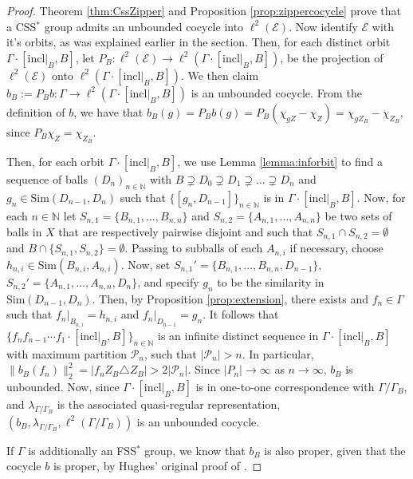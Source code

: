 \documentclass[12pt]{amsart}
\numberwithin{equation}{subsection}
\theoremstyle{definition}
\theoremstyle{definition}
\theoremstyle{remark}
\begin{document}
\begin{proof}
     Theorem \ref{thm:CssZipper} and Proposition \ref{prop:zippercocycle} prove that a CSS$^*$ group admits an unbounded cocycle into $\ell^2(\mathcal E)$. Now identify $\mathcal E$ with it's orbits, as was explained earlier in the section. Then, for each distinct orbit $\Gamma \cdot [\text{incl}\vert_B, B]$, let $P_B: \ell^2(\mathcal E) \rightarrow \ell^2(\Gamma \cdot [\text{incl}\vert_B, B])$, be the projection of $\ell^2(\mathcal E)$ onto $\ell^2(\Gamma \cdot [\text{incl}\vert_B, B])$. We then claim $b_B := P_Bb: \Gamma \rightarrow \ell^2(\Gamma \cdot [\text{incl}\vert_B, B])$ is an unbounded cocycle. From the definition of $b$, we have that $b_B(g)= P_Bb(g) = P_B( \chi_{gZ} - \chi_{Z})= \chi_{gZ_B} - \chi_{Z_B}$, since $P_B\chi_Z = \chi_{Z_B}$. 

     Then, for each orbit $\Gamma \cdot [\text{incl}\vert_B, B]$, we use Lemma \ref{lemma:inforbit} to find a sequence of balls $(D_n)_{n \in \mathbb N}$ with $ B \supsetneq D_0 \supsetneq D_1 \supsetneq \dots \supsetneq D_n$ and $g_n \in \text{Sim}(D_{n-1},D_n)$ such that $\{ [g_n,D_{n-1}]\}_{n \in \mathbb N}$ is in $\Gamma \cdot [\text{incl}\vert_B, B]$. Now, for each $n \in \mathbb N$ let $S_{n,1} = \{B_{n,1}, \dots, B_{n,n} \}$ and $S_{n,2} = \{A_{n,1}, \dots, A_{n,n} \}$ be two sets of balls in $X$ that are respectively pairwise disjoint and such that $S_{n,1} \cap S_{n,2} = \emptyset$ and $B \cap \{  S_{n,1}, S_{n,2}\} = \emptyset$. Passing to subballs of each $A_{n,i}$ if necessary, choose $h_{n,i} \in \text{Sim}(B_{n,i},A_{n,i})$. Now, set $S_{n,1}' = \{B_{n,1}, \dots, B_{n,n}, D_{n-1} \}$, $S_{n,2}' = \{A_{n,1}, \dots, A_{n,n}, D_n  \}$, and specify $g_n$ to be the similarity in $\text{Sim}(D_{n-1},D_n)$. Then, by Proposition \ref{prop:extension}, there exists and $f_n \in \Gamma$ such that $f_n\vert_{B_{n,i}} = h_{n,i}$ and $f_n\vert_{D_{n-1}} = g_n$. It follows that $\{ f_nf_{n-1}\cdots f_1\cdot [\text{incl}\vert_B,B]\}_{n \in \mathbb N}$ is an infinite distinct sequence in  $\Gamma \cdot [\text{incl}\vert_B, B]$ with maximum partition $\mathcal P_n$, such that $\vert \mathcal P_n \vert >n$. In particular, $\|b_B(f_n) \|_2^2 = \vert f_nZ_B \triangle Z_B\vert > 2\vert \mathcal P_n \vert$. Since $\vert P_n\vert \rightarrow \infty$ as $n \rightarrow \infty$,  $b_B$ is unbounded. Now, since $\Gamma \cdot [\text{incl}\vert_B, B]$ is in one-to-one correspondence with $\Gamma / \Gamma_B$, and $\lambda_{\Gamma / \Gamma_B}$ is the associated quasi-regular representation, $(b_B,\lambda_{\Gamma/\Gamma_B},\ell^2(\Gamma / \Gamma_B))$ is an unbounded cocycle.  
     
     If $\Gamma$ is additionally an FSS$^*$ group, we know that $b_B$ is also proper, given that the cocycle $b$ is proper, by Hughes' original proof of \cite[Theorem 6.1]{hughes2009}.
\end{proof}
\end{document}
